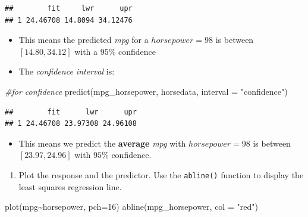 \documentclass[
]{article}
\newenvironment{Shaded}{\begin{snugshade}}{\end{snugshade}}
\newcommand{\AttributeTok}[1]{\textcolor[rgb]{0.77,0.63,0.00}{#1}}
\newcommand{\CommentTok}[1]{\textcolor[rgb]{0.56,0.35,0.01}{\textit{#1}}}
\newcommand{\DecValTok}[1]{\textcolor[rgb]{0.00,0.00,0.81}{#1}}
\newcommand{\FunctionTok}[1]{\textcolor[rgb]{0.00,0.00,0.00}{#1}}
\newcommand{\NormalTok}[1]{#1}
\newcommand{\SpecialCharTok}[1]{\textcolor[rgb]{0.00,0.00,0.00}{#1}}
\newcommand{\StringTok}[1]{\textcolor[rgb]{0.31,0.60,0.02}{#1}}
\providecommand{\tightlist}{%
  \setlength{\itemsep}{0pt}\setlength{\parskip}{0pt}}
\begin{document}
\begin{verbatim}
##        fit     lwr      upr
## 1 24.46708 14.8094 34.12476
\end{verbatim}

\begin{itemize}
\item
  This means the predicted \emph{mpg} for a \(horsepower = 98\) is
  between \([14.80, 34.12]\) with a \(95\%\) confidence
\item
  The \emph{confidence interval} is:
\end{itemize}

\begin{Shaded}
\begin{Highlighting}[]
\CommentTok{\#for confidence}
\FunctionTok{predict}\NormalTok{(mpg\_horsepower, horsedata, }\AttributeTok{interval =} \StringTok{"confidence"}\NormalTok{)}
\end{Highlighting}
\end{Shaded}

\begin{verbatim}
##        fit      lwr      upr
## 1 24.46708 23.97308 24.96108
\end{verbatim}

\begin{itemize}
\tightlist
\item
  This means we predict the \textbf{average} \emph{mpg} with
  \(horsepower = 98\) is between \([23.97, 24.96]\) with \(95\%\)
  confidence.
\end{itemize}

\begin{enumerate}
\def\labelenumi{(\alph{enumi})}
\setcounter{enumi}{1}
\tightlist
\item
  Plot the response and the predictor. Use the \texttt{abline()}
  function to display the least squares regression line.
\end{enumerate}

\begin{Shaded}
\begin{Highlighting}[]
\FunctionTok{plot}\NormalTok{(mpg}\SpecialCharTok{\textasciitilde{}}\NormalTok{horsepower, }\AttributeTok{pch=}\DecValTok{16}\NormalTok{)}
\FunctionTok{abline}\NormalTok{(mpg\_horsepower, }\AttributeTok{col =} \StringTok{"red"}\NormalTok{)}
\end{Highlighting}
\end{Shaded}
\end{document}

